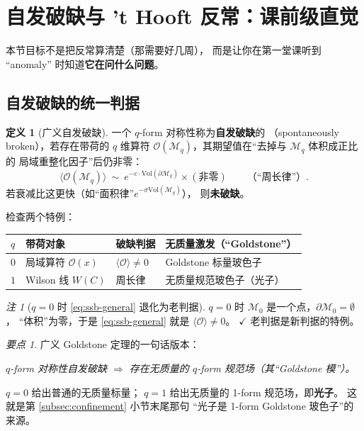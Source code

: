 \documentclass[UTF8,a4paper,11pt]{ctexart}
\theoremstyle{plain}
\theoremstyle{definition}
\newtheorem{definition}{定义}[section]
\theoremstyle{remark}
\newtheorem{remark}{注}[section]
\newtheorem{keypoint}{要点}[section]
\newcommand{\Op}{\mathcal{O}}
\newcommand{\Mfd}{\mathcal{M}}
\newcommand{\en}[1]{\textsf{#1}}       %
\begin{document}
\section{自发破缺与 't Hooft 反常：课前级直觉}
\label{sec:ssb}

本节目标不是把反常算清楚（那需要好几周），
而是让你在第一堂课听到 “anomaly” 时知道\textbf{它在问什么问题}。

\subsection{自发破缺的统一判据}
\label{subsec:ssb-unified}

\begin{definition}[广义自发破缺]
一个 $q$-form 对称性称为\textbf{自发破缺}的
（\en{spontaneously broken}），若存在带荷的 $q$ 维算符
$\Op(\Mfd_q)$，其期望值在“去掉与 $\Mfd_q$ 体积成正比的
局域重整化因子”后仍非零：
\begin{equation}
  \big\langle \Op(\Mfd_q)\big\rangle
  \ \sim\ e^{-c\cdot\mathrm{Vol}(\partial\Mfd_q)}
  \times(\text{非零})
  \qquad\text{（“周长律”）} .
  \label{eq:ssb-general}
\end{equation}
若衰减比这更快（如“面积律”$e^{-\sigma\mathrm{Vol}(\Mfd_q)}$），
则\textbf{未破缺}。
\end{definition}

检查两个特例：

\begin{center}
\begin{tabular}{@{}llll@{}}
\toprule
$q$ & 带荷对象 & 破缺判据 & 无质量激发（“Goldstone”） \\
\midrule
$0$ & 局域算符 $\Op(x)$ & $\langle\Op\rangle\ne0$
    & Goldstone 标量玻色子 \\
$1$ & Wilson 线 $W(C)$ & 周长律
    & 无质量规范玻色子（光子） \\
\bottomrule
\end{tabular}
\end{center}

\begin{remark}[$q=0$ 时 \eqref{eq:ssb-general} 退化为老判据]
$q=0$ 时 $\Mfd_0$ 是一个点，$\partial\Mfd_0=\emptyset$，
“体积”为零，于是 \eqref{eq:ssb-general} 就是 $\langle\Op\rangle\ne0$。
$\checkmark$ 老判据是新判据的特例。
\end{remark}

\begin{keypoint}
\label{kp:goldstone-general}
广义 Goldstone 定理的一句话版本：
\begin{center}
\emph{$q$-form 对称性自发破缺 $\Rightarrow$ 存在无质量的
$q$-form 规范场（其“Goldstone 模”）。}
\end{center}
$q=0$ 给出普通的无质量标量；
$q=1$ 给出无质量的 1-form 规范场，即\textbf{光子}。
这就是第 \ref{subsec:confinement} 小节末尾那句
“光子是 1-form Goldstone 玻色子”的来源。
\end{keypoint}
\end{document}
